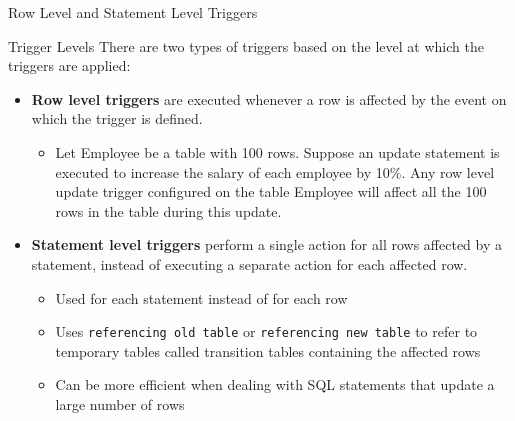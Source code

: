 \documentclass[aspectratio=169, xcolor=dvipsnames]{beamer}
\begin{document}
\begin{frame}{Row Level and Statement Level Triggers}
    \begin{block}{Trigger Levels}
        There are two types of triggers based on the level at which the triggers are applied:
        \begin{itemize}[<+->]
            \item \textbf{Row level triggers} are executed whenever a row is affected by the event on which the trigger is defined.
            \begin{itemize}
                \item[$\triangleright$] Let Employee be a table with 100 rows. Suppose an update statement is executed to increase the salary of each employee by 10\%. Any row level update trigger configured on the table Employee will affect all the 100 rows in the table during this update.
            \end{itemize}
            \item \textbf{Statement level triggers} perform a single action for all rows affected by a statement, instead of executing a separate action for each affected row.
            \begin{itemize}
                \item[$\triangleright$] Used for each statement instead of for each row
                \item[$\triangleright$] Uses \texttt{referencing old table} or \texttt{referencing new table} to refer to temporary tables called transition tables containing the affected rows
                \item[$\triangleright$] Can be more efficient when dealing with SQL statements that update a large number of rows
            \end{itemize}
        \end{itemize}
    \end{block}
\end{frame}
\end{document}
